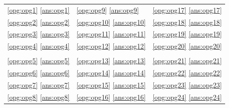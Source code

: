 \documentclass[a4paper,12pt,fleqn,dutch,mimicwordtwentyten]{tisdexam}
\begin{document}
\begin{questions}
\begin{tabular}{p{5cm} p{5cm} p{5cm}}
  \ref{opg:opg1} \ref{ans:opg1} & \ref{opg:opg9} \ref{ans:opg9}   & \ref{opg:opg17} \ref{ans:opg17} \\ 
  \ref{opg:opg2} \ref{ans:opg2} & \ref{opg:opg10} \ref{ans:opg10} & \ref{opg:opg18} \ref{ans:opg18} \\ 
  \ref{opg:opg3} \ref{ans:opg3} & \ref{opg:opg11} \ref{ans:opg11} & \ref{opg:opg19} \ref{ans:opg19} \\ 
  \ref{opg:opg4} \ref{ans:opg4} & \ref{opg:opg12} \ref{ans:opg12} & \ref{opg:opg20} \ref{ans:opg20} \\ 
                                &                                 &                                 \\ 
  \ref{opg:opg5} \ref{ans:opg5} & \ref{opg:opg13} \ref{ans:opg13} & \ref{opg:opg21} \ref{ans:opg21} \\ 
  \ref{opg:opg6} \ref{ans:opg6} & \ref{opg:opg14} \ref{ans:opg14} & \ref{opg:opg22} \ref{ans:opg22} \\ 
  \ref{opg:opg7} \ref{ans:opg7} & \ref{opg:opg15} \ref{ans:opg15} & \ref{opg:opg23} \ref{ans:opg23} \\ 
  \ref{opg:opg8} \ref{ans:opg8} & \ref{opg:opg16} \ref{ans:opg16} & \ref{opg:opg24} \ref{ans:opg24} \\ 
\end{tabular}   

\makeatletter
\AtEndDocument{%
  \if@filesw
    \newwrite\tempfile

}
\end{questions}
\end{document}
